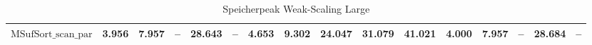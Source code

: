 \begin{table}
{\begin{tabular}{lrrrrrrrrrrrrrrr}
    $\text{MSufSort\_scan\_par}$ & {\color{green!60!black}3.956} & {\color{green!60!black}7.957} & {\color{darkgray}--} & {\color{green!60!black}28.643} & {\color{darkgray}--} & 4.653 & 9.302 & {\color{red}24.047} & {\color{red}31.079} & {\color{red}41.021} & {\color{green!60!black}4.000} & {\color{green!60!black}7.957} & {\color{darkgray}--} & {\color{red}28.684} & {\color{darkgray}--} \\
\bottomrule
\end{tabular}
}
\caption{Speicherpeak Weak-Scaling Large}
\label{messung:tab:mem-weak-large}
\end{table}

